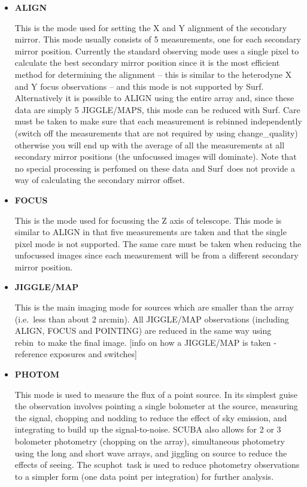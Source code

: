\documentclass[twoside,11pt]{article}
\newcommand{\scusoft}          {{\sc Surf}}
\newcommand{\task}[1]{{\sf #1}}
\newcommand{\rebin}{\htmlref{\task{rebin}}{REBIN}}
\newcommand{\chgqual}{\htmlref{\task{change\_quality}}{CHANGE_QUALITY}}
\newcommand{\scuphot}{\htmlref{\task{scuphot}}{SCUPHOT}}
\newcommand{\htmlref}[2]{#1}
\begin{document}
\begin{itemize}

\item {\bf ALIGN} 

This is the mode used for setting the X and Y alignment of the secondary
mirror. This mode usually consists of 5 measurements, one for each secondary
mirror position. Currently the standard observing mode uses a single pixel to
calculate the best secondary mirror position since it is the most efficient
method for determining the alignment -- this is similar to the heterodyne X
and Y focus observations -- and this mode is not supported by \scusoft. 
Alternatively it is possible to ALIGN using the entire array and,
since these data are simply 5 JIGGLE/MAPS, this mode can be reduced with
\scusoft.  Care must be taken to make sure that each measurement is rebinned
independently (switch off the measurements that are not required by using
\chgqual) otherwise you will end up with the average of all the measurements
at all secondary mirror positions (the unfocussed images will dominate). Note
that no special processing is perfomed on these data and \scusoft\ does not
provide a way of calculating the secondary mirror offset.

\item {\bf FOCUS}

This is the mode used for focussing the Z axis of telescope. This mode is
similar to ALIGN in that five measurements are taken and that the single pixel
mode is not supported. The same care must be taken when reducing the 
unfocussed images since each measurement will be from a different secondary
mirror position.

\item {\bf JIGGLE/MAP}

This is the main imaging mode for sources which are smaller than the array
(i.e.\ less than about 2 arcmin). All JIGGLE/MAP observations (including
ALIGN, FOCUS and POINTING) are reduced in the same way using \rebin\ to
make the final image. [info on how a JIGGLE/MAP is taken - reference exposures
and switches]

\item {\bf PHOTOM}

This mode is used to measure the flux of a point source. In its simplest guise
the observation involves pointing a single bolometer at the source, measuring
the signal, chopping and nodding to reduce the effect of sky emission, and
integrating to build up the signal-to-noise. SCUBA also allows for 2 or 3
bolometer photometry (chopping on the array), simultaneous photometry using
the long and short wave arrays, and jiggling on source to reduce the effects
of seeing. The \scuphot\ task is used to reduce photometry observations
to a simpler form (one data point per integration) for further analysis.


\end{itemize}
\end{document}
